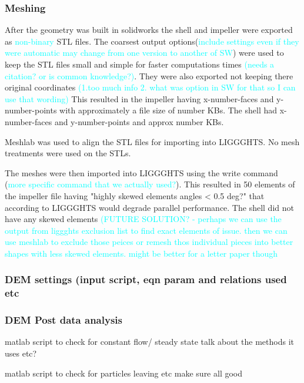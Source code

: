 \documentclass[preprint,11pt,authoryear]{elsarticle}
\begin{document}
    

    \subsubsection{Meshing}
    \par After the geometry was built in solidworks the shell and impeller were exported as \textcolor{cyan}{non-binary} STL files. The coarsest output options(\textcolor{cyan}{include settings even if they were automatic may change from one version to another of SW}) were used to keep the STL files small and simple for faster computations times \textcolor{cyan}{(needs a citation? or is common knowledge?)}. They were also exported not keeping there original coordinates \textcolor{cyan}{(1.too much info 2. what was option in SW for that so I can use that wording)} This resulted in the impeller having x-number-faces and y-number-points with approximately a file size of number KBs. The shell had x-number-faces and y-number-points and approx number KBs.  
    \par Meshlab was used to align the STL files for importing into LIGGGHTS. No mesh treatments were used on the STLs. 
    \par The meshes were then imported into LIGGGHTS using the write command (\textcolor{cyan}{more specific command that we actually used?}). This resulted in 50 elements of the impeller file having "highly skewed elements angles < 0.5 deg?" that according to LIGGGHTS would degrade parallel performance. The shell did not have any skewed elements \textcolor{cyan}{(FUTURE SOLUTION? - perhaps we can use the output from liggghts exclusion list to find exact elements of issue. then we can use meshlab to exclude those peices or remesh thos individual pieces into better shapes with less skewed elements. might be better for a letter paper though}
    
    \subsubsection{DEM settings (input script, eqn param and relations used etc}
    
    \subsubsection{DEM Post data analysis}
    \par matlab script to check for constant flow/ steady state talk about the methods it uses etc? 
    
    \par matlab script to check for particles leaving etc make sure all good 
     
\end{document}
